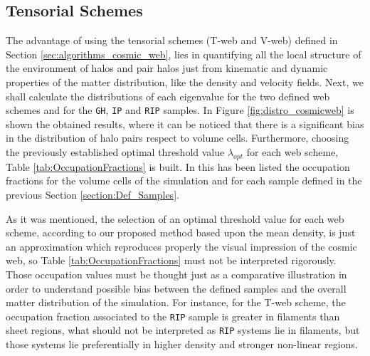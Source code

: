 \documentclass[a4,useAMS,usenatbib,usegraphicx]{latex/mn2e}
\begin{document}
\subsection{Tensorial Schemes}
\label{subsec:tensorial_schemes}



The advantage of using the tensorial schemes (T-web and V-web) defined in
Section \ref{sec:algorithms_cosmic_web}, lies in quantifying all the local 
structure of the environment of halos and pair halos just from kinematic 
and dynamic properties of the matter distribution, like the density and 
velocity fields. Next, we shall calculate the distributions of each 
eigenvalue for the two defined web schemes and for the \texttt{GH}, 
\texttt{IP} and \texttt{RIP} samples. In Figure \ref{fig:distro_cosmicweb} 
is shown the obtained results, where it can be noticed that there is a 
significant bias in the distribution of halo pairs respect to volume cells. 
Furthermore, choosing the previously established optimal threshold value 
$\lambda_{opt}$ for each web scheme, Table \ref{tab:OccupationFractions} 
is built. In this has been listed the occupation fractions for the volume 
cells of the simulation and for each sample defined in the previous Section 
\ref{section:Def_Samples}.



As it was mentioned, the selection of an optimal threshold value for each 
web scheme, according to our proposed method based upon the mean density, 
is just an approximation which reproduces properly the visual impression 
of the cosmic web, so Table \ref{tab:OccupationFractions} must not be 
interpreted rigorously. Those occupation values must be thought just as a 
comparative illustration in order to understand possible bias between the 
defined samples and the overall matter distribution of the simulation. For 
instance, for the T-web scheme, the occupation fraction associated to the 
\texttt{RIP} sample is greater in filaments than sheet regions, what 
should not be interpreted as \texttt{RIP} systems lie in filaments, but 
those systems lie preferentially in higher density and stronger non-linear 
regions.
\end{document}
